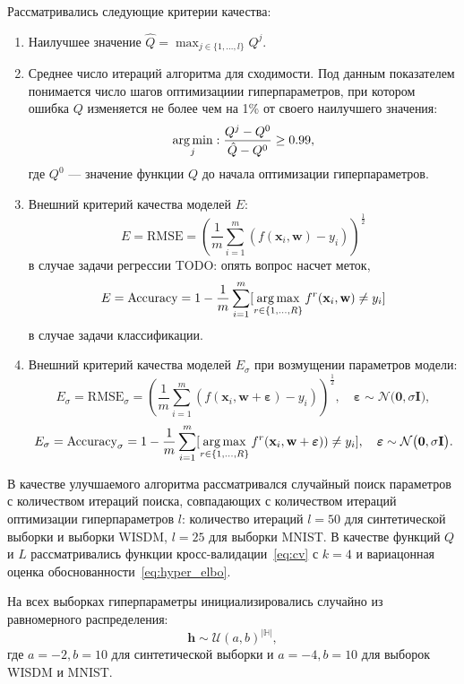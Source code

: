 Рассматривались следующие критерии качества:
\begin{enumerate}
\item Наилучшее значение $\hat{Q} = \max_{j \in \{1, \dots, l\}}Q^j$.
\item Среднее число итераций алгоритма для сходимости. Под данным показателем понимается число шагов оптимизациии гиперпараметров, при котором ошибка $Q$ изменяется не более чем на 1\% от своего наилучшего значения:
\[
    \operatorname*{arg\,min}_{j}: \frac{Q^j - Q^0}{\hat{Q} - Q^0} \geq 0.99,
\]
где $Q^0$ --- значение функции $Q$ до начала оптимизации гиперпараметров.

\item Внешний критерий качества моделей $E$:
\[
    E = \text{RMSE} = \left (\frac{1}{m}\sum_{i=1}^m (f(\mathbf{x}_i, \mathbf{w})-y_i)\right)^{\frac{1}{2}}
\]
в случае задачи регрессии TODO: опять вопрос насчет меток,
\[
    E = \text{Accuracy} = 1 - \frac{1}{m}\sum_{i=1}^m [\operatorname*{arg\,max}_{r \in \{1, \dots, R\}}f^r(\mathbf{x}_i, \mathbf{w}) \neq y_i]
\]
в случае задачи классификации.

\item Внешний критерий качества моделей $E_\sigma$ при возмущении параметров модели:
\[
    E_\sigma = \text{RMSE}_\sigma = \left (\frac{1}{m}\sum_{i=1}^m (f(\mathbf{x}_i, \mathbf{w} + \boldsymbol{\varepsilon})-y_i)\right)^{\frac{1}{2}}, \quad \boldsymbol{\varepsilon} \sim \mathcal{N}\bigl(\mathbf{0}, \sigma\mathbf{I}\bigr),
\]
\[
    E_\sigma  = \text{Accuracy}_\sigma  = 1 - \frac{1}{m}\sum_{i=1}^m [\operatorname*{arg\,max}_{r \in \{1, \dots, R\}}f^r(\mathbf{x}_i, \mathbf{w }  + \boldsymbol{\varepsilon})) \neq y_i],  \quad \boldsymbol{\varepsilon} \sim \mathcal{N}\bigl(\mathbf{0}, \sigma\mathbf{I}\bigr).
\]

\end{enumerate}

В качестве улучшаемого алгоритма рассматривался случайный поиск параметров с количеством итераций поиска, совпадающих с количеством итераций оптимизации гиперпараметров $l$: количество итераций $l=50$ для синтетической выборки и выборки WISDM, $l=25$ для выборки MNIST. В качестве функций $Q$ и $L$ рассматривались функции кросс-валидации~\eqref{eq:cv} с $k=4$ и вариацонная оценка обоснованности~\eqref{eq:hyper_elbo}. 




На всех выборках гиперпараметры инициализировались случайно из равномерного распределения:
\[
    \mathbf{h} \sim \mathcal{U}(a,b)^{|\mathbb{H}|},
\]
где $a = -2, b = 10$ для синтетической выборки и $a = -4, b = 10$ для выборок WISDM и MNIST.

